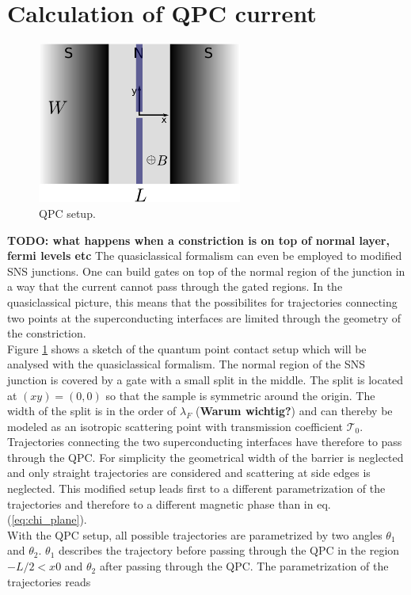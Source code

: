 \section{Calculation of QPC current}
\begin{figure}
\centering
\includegraphics[width=0.6\textwidth]{figure/analyticalmodel/qpc_sns_junction}
\caption{QPC setup.}
\label{fig:qpc_sns_schematic}
\end{figure}
\textbf{TODO: what happens when a constriction is on top of normal layer, fermi levels etc}
The quasiclassical formalism can even be employed to modified SNS junctions. One can build gates on top of the normal region of the junction in a way that the current cannot pass through the gated regions. In the quasiclassical picture, this means that the possibilites for trajectories connecting two points at the superconducting interfaces are limited through the geometry of the constriction.\\
Figure \ref{fig:qpc_sns_schematic} shows a sketch of the quantum point contact setup which will be analysed with the quasiclassical formalism. The normal region of the SNS junction is covered by a gate with a small split in the middle. The split is located at $(x y) = (0, 0)$ so that the sample is symmetric around the origin. The width of the split is in the order of $\lambda_F$ (\textbf{Warum wichtig?}) and can thereby be modeled as an isotropic scattering point with transmission coefficient $\mathcal{T}_0$. Trajectories connecting the two superconducting interfaces have therefore to pass through the QPC. For simplicity the geometrical width of the barrier is neglected and only straight trajectories are considered and scattering at side edges is neglected. This modified setup leads first to a different parametrization of the trajectories and therefore to a different magnetic phase than in eq. (\ref{eq:chi_plane}).\\
With the QPC setup, all possible trajectories are parametrized by two angles $\theta_1$ and $\theta_2$. $\theta_1$ describes the trajectory before passing through the QPC in the region $ -L/2 < x 0$ and  $\theta_2$ after passing through the QPC. The parametrization of the trajectories reads
